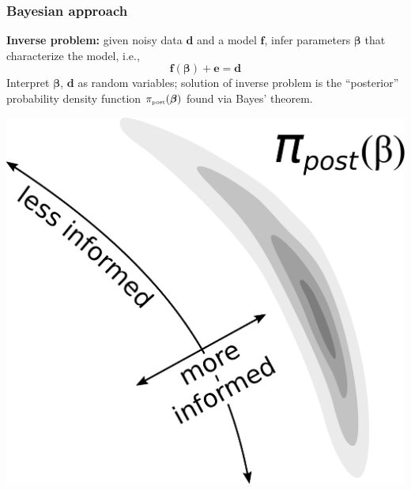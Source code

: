 \documentclass[10pt,final,xcolor=dvipsnames]{beamer}
\newcommand{\bs}[1]{\ensuremath{\boldsymbol{#1}}}
\begin{document}
\begin{frame}
  \frametitle{Bayesian approach} \textbf{Inverse problem:}
  given noisy data $\bs d$ and a model
  $\bs f$, infer parameters $\bs \beta$ that characterize the model, i.e.,
  \begin{equation*}
    \bs f(\bs \beta) + \bs e = \bs d
  \end{equation*}
  Interpret $\bs \beta$, $\bs d$ as random variables;
  solution of inverse problem is the ``posterior'' probability density function
  $\pi_{\mbox{\tiny post}}(\bs \beta)$ found via Bayes' theorem.\\
  \vspace{1em}
  \begin{center}
  	\includegraphics[scale=0.23]{informed_uninformed_modes.pdf}
  \end{center}
\end{frame}
\end{document}
